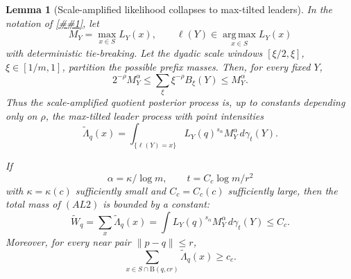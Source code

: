 \documentclass[10pt]{article}
\newcommand{\cref}[1]{\ref{##1}}
\newtheorem{lemma}[theorem]{Lemma}
\theoremstyle{definition}
\newcommand{\Ball}{\mathrm{B}}
\begin{document}
\begin{lemma}[Scale-amplified likelihood collapses to max-tilted leaders]
   \label{lem:scale-amplified-alpha-leader}
   In the notation of \cref{lem:likelihood-rank-prefix}, let
   \[
      M_Y=\max_{x\in S}L_Y(x),
      \qquad
      \ell(Y)\in\operatorname*{arg\,max}_{x\in S}L_Y(x)
   \]
   with deterministic tie-breaking.  Let the dyadic scale windows
   \([\xi/2,\xi]\), \(\xi\in[1/m,1]\), partition the possible prefix masses.
   Then, for every fixed \(Y\),
   \[
      2^{-\rho}M_Y^\alpha
      \le
      \sum_{\xi}\xi^{-\rho}B_\xi(Y)
      \le
      M_Y^\alpha .
      \tag{AL1}
   \]
   Thus the scale-amplified quotient posterior process is, up to constants
   depending only on \(\rho\), the max-tilted leader process with point
   intensities
   \[
      \widetilde\Lambda_q(x)
      =
      \int_{\{\ell(Y)=x\}}
      L_Y(q)^{s_\alpha}M_Y^\alpha\,d\gamma_t(Y).
      \tag{AL2}
   \]

   If
   \[
      \alpha=\kappa/\log m,\qquad
      t=C_c\log m/r^2
   \]
   with \(\kappa=\kappa(c)\) sufficiently small and \(C_c=C_c(c)\)
   sufficiently large, then the total mass of \((AL2)\) is bounded by a
   constant:
   \[
      \widetilde W_q=\sum_x\widetilde\Lambda_q(x)
      =
      \int L_Y(q)^{s_\alpha}M_Y^\alpha\,d\gamma_t(Y)
      \le C_c .
      \tag{AL3}
   \]
   Moreover, for every near pair \(\|p-q\|\le r\),
   \[
      \sum_{x\in S\cap\Ball(q,cr)}\widetilde\Lambda_q(x)\ge c_c .
      \tag{AL4}
   \]
\end{lemma}
\end{document}
